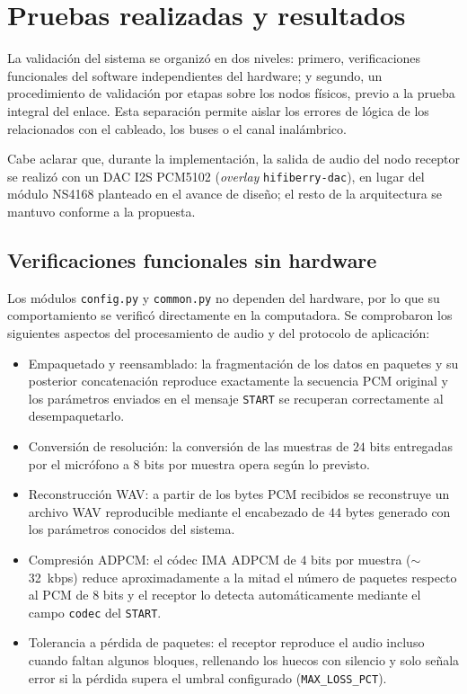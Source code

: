 
\section{Pruebas realizadas y resultados}

La validación del sistema se organizó en dos niveles: primero, verificaciones funcionales del software independientes del hardware; y segundo, un procedimiento de validación por etapas sobre los nodos físicos, previo a la prueba integral del enlace.
Esta separación permite aislar los errores de lógica de los relacionados con el cableado, los buses o el canal inalámbrico.

Cabe aclarar que, durante la implementación, la salida de audio del nodo receptor se realizó con un DAC I2S PCM5102 (\textit{overlay} \texttt{hifiberry-dac}), en lugar del módulo NS4168 planteado en el avance de diseño; el resto de la arquitectura se mantuvo conforme a la propuesta.

\subsection{Verificaciones funcionales sin hardware}

Los módulos \texttt{config.py} y \texttt{common.py} no dependen del hardware, por lo que su comportamiento se verificó directamente en la computadora.
Se comprobaron los siguientes aspectos del procesamiento de audio y del protocolo de aplicación:

\begin{itemize}
    \item Empaquetado y reensamblado: la fragmentación de los datos en paquetes y su posterior concatenación reproduce exactamente la secuencia PCM original y los parámetros enviados en el mensaje \texttt{START} se recuperan correctamente al desempaquetarlo.
    \item Conversión de resolución: la conversión de las muestras de $24$ bits entregadas por el micrófono a $8$ bits por muestra opera según lo previsto.
    \item Reconstrucción WAV: a partir de los bytes PCM recibidos se reconstruye un archivo WAV reproducible mediante el encabezado de $44$ bytes generado con los parámetros conocidos del sistema.
    \item Compresión ADPCM: el códec IMA ADPCM de $4$ bits por muestra ($\sim$\SI{32}{kbps}) reduce aproximadamente a la mitad el número de paquetes respecto al PCM de $8$ bits y el receptor lo detecta automáticamente mediante el campo \texttt{codec} del \texttt{START}.
    \item Tolerancia a pérdida de paquetes: el receptor reproduce el audio incluso cuando faltan algunos bloques, rellenando los huecos con silencio y solo señala error si la pérdida supera el umbral configurado (\texttt{MAX\_LOSS\_PCT}).
\end{itemize}

